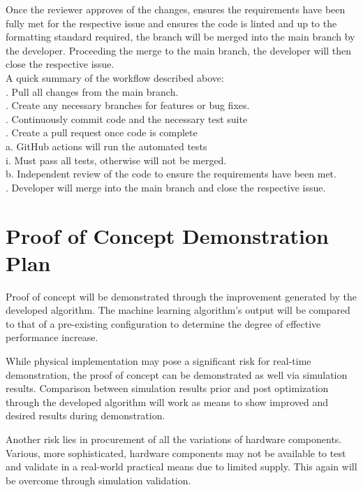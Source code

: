 \documentclass[12pt,a4]{report}
\begin{document}
Once the reviewer approves of the changes, ensures the requirements have been fully met for the respective issue and ensures the code is linted and up to the formatting standard required, the branch will be merged into the main branch by the developer. Proceeding the merge to the main branch, the developer will then close the respective issue.\\

\noindent A quick summary of the workflow described above:\\

.	Pull all changes from the main branch.\\
.	Create any necessary branches for features or bug fixes.\\
.	Continuously commit code and the necessary test suite\\
.	Create a pull request once code is complete\\
\indent a.	GitHub actions will run the automated tests\\
\indent \indent  i.	Must pass all tests, otherwise will not be merged.\\
\indent b.	Independent review of the code to ensure the requirements have been met.\\
.	Developer will merge into the main branch and close the respective issue.\\


\section*{Proof of Concept Demonstration Plan}
Proof of concept will be demonstrated through the improvement generated by the developed algorithm. The machine learning algorithm’s output will be compared to that of a pre-existing configuration to determine the degree of effective performance increase. 

While physical implementation may pose a significant risk for real-time demonstration, the proof of concept can be demonstrated as well via simulation results. Comparison between simulation results prior and post optimization through the developed algorithm will work as means to show improved and desired results during demonstration.

Another risk lies in procurement of all the variations of hardware components. Various, more sophisticated, hardware components may not be available to test and validate in a real-world practical means due to limited supply. This again will be overcome through simulation validation. 
\end{document}
